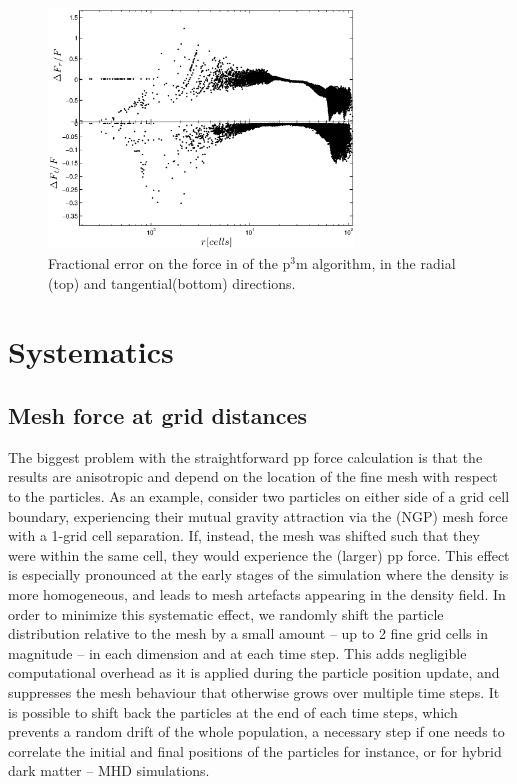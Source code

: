 \begin{figure}%
  \begin{center}
    \includegraphics[width=3.2in]{graphs/densityForce_fracErr.eps}
  \caption{Fractional error on the force in of the p$^3$m algorithm, in the radial (top) and tangential(bottom) directions.
    \label{fig:den_force_fracErr}}
\end{center}
\end{figure}


\section{Systematics}
\label{sec:systematics}

\subsection{Mesh force at grid distances}

The biggest problem with the straightforward pp force calculation is that the results 
are anisotropic and depend on the location of the fine mesh with respect 
to the particles. As an example, consider two particles on either side of a grid 
cell boundary, experiencing their mutual gravity attraction via the (NGP) mesh force with a 1-grid cell separation.
 If, instead, the mesh was shifted such that they were
within the same cell, they would experience the (larger) pp force. 
This effect is especially pronounced at the early stages of the simulation where
the density is more homogeneous, and leads to mesh artefacts appearing
in the density field. In order to minimize this systematic effect, 
we randomly shift the particle distribution relative to the mesh by a small
amount -- up to 2 fine grid cells in magnitude -- in each
dimension and at each time step.  This adds negligible computational
overhead as it is applied during the particle position update,
and suppresses the mesh behaviour that otherwise grows over multiple time steps.
It is possible to shift back the particles at the end of each time steps,
which prevents a random drift of the whole population, a necessary step 
if one needs to correlate the initial and final positions of the particles for instance,
or for hybrid dark matter -- MHD simulations.
 
